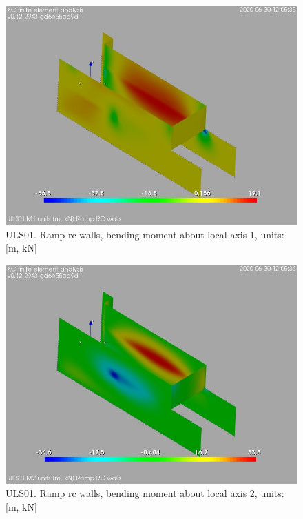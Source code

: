 \begin{figure}
\begin{center}
\includegraphics[width=\linewidth]{ramp_wall/resLC/text/graphics/resSimplLC/lULS01wallsM1}
\caption{ULS01. Ramp rc walls, bending moment about local axis 1, units:[m, kN]}
\end{center}
\end{figure}
\begin{figure}
\begin{center}
\includegraphics[width=\linewidth]{ramp_wall/resLC/text/graphics/resSimplLC/lULS01wallsM2}
\caption{ULS01. Ramp rc walls, bending moment about local axis 2, units:[m, kN]}
\end{center}
\end{figure}
